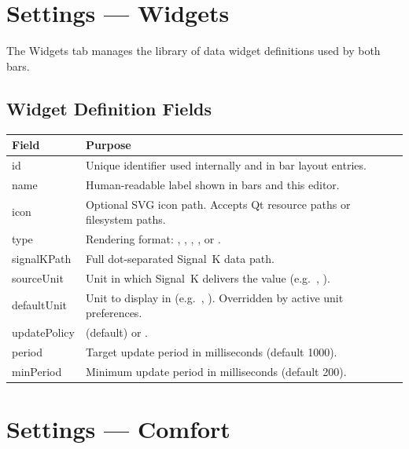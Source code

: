 \chapter{Settings --- Widgets}
\label{ch:settings-widgets}

The Widgets tab manages the library of data widget definitions used by both bars.


\section{Widget Definition Fields}

\begin{longtable}{L{2.8cm}L{10.9cm}}
\toprule
{}
\color{white}\sffamily\bfseries Field &
\color{white}\sffamily\bfseries Purpose \\
\midrule
id            & Unique identifier used internally and in bar layout entries. \\
name          & Human-readable label shown in bars and this editor. \\
icon          & Optional SVG icon path. Accepts Qt resource paths or filesystem paths. \\
type          & Rendering format: , , ,
                , or . \\
signalKPath   & Full dot-separated Signal~K data path. \\
sourceUnit    & Unit in which Signal~K delivers the value (e.g.\ , ). \\
defaultUnit   & Unit to display in (e.g.\ , ).
                Overridden by active unit preferences. \\
updatePolicy  &  (default) or . \\
period        & Target update period in milliseconds (default 1000). \\
minPeriod     & Minimum update period in milliseconds (default 200). \\
\bottomrule
\end{longtable}

\chapter{Settings --- Comfort}
\label{ch:settings-comfort}

